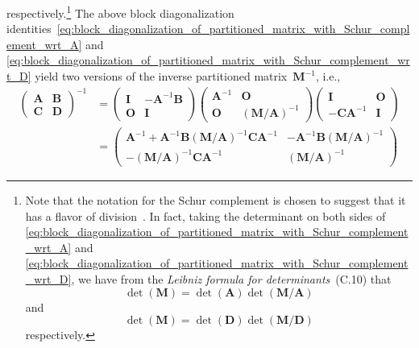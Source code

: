 \documentclass[12pt,a4paper]{article}
\begin{document}
respectively.\footnote{%
Note that the notation for the Schur complement is chosen to suggest that
it has a flavor of division~\citep{Minka:OldNewMatrixAlgebra}.
In fact, taking the determinant on both sides of
\eqref{eq:block_diagonalization_of_partitioned_matrix_with_Schur_complement_wrt_A} and
\eqref{eq:block_diagonalization_of_partitioned_matrix_with_Schur_complement_wrt_D},
we have from the \emph{Leibniz formula for determinants}~(C.10) that
\begin{equation}
\operatorname{det}(\mathbf{M}) =
\operatorname{det}(\mathbf{A}) \operatorname{det}(\mathbf{M}/\mathbf{A})
\end{equation}
and
\begin{equation}
\operatorname{det}(\mathbf{M}) =
\operatorname{det}(\mathbf{D}) \operatorname{det}(\mathbf{M}/\mathbf{D})
\end{equation}
respectively.}
The above block diagonalization
identities~\eqref{eq:block_diagonalization_of_partitioned_matrix_with_Schur_complement_wrt_A}
and \eqref{eq:block_diagonalization_of_partitioned_matrix_with_Schur_complement_wrt_D} yield
two versions of the inverse partitioned matrix~$\mathbf{M}^{-1}$, i.e.,
\begin{align}
\begin{pmatrix}
\mathbf{A} & \mathbf{B} \\
\mathbf{C} & \mathbf{D}
\end{pmatrix}^{-1}
&=
\begin{pmatrix}
\mathbf{I} & -\mathbf{A}^{-1}\mathbf{B} \\
\mathbf{O} & \mathbf{I}
\end{pmatrix}
\begin{pmatrix}
\mathbf{A}^{-1} & \mathbf{O} \\
\mathbf{O} & \left(\mathbf{M}/\mathbf{A}\right)^{-1}
\end{pmatrix}
\begin{pmatrix}
\mathbf{I} & \mathbf{O} \\
-\mathbf{C}\mathbf{A}^{-1} & \mathbf{I}
\end{pmatrix} \\
&=
\begin{pmatrix}
\mathbf{A}^{-1} +
\mathbf{A}^{-1}\mathbf{B} \left(\mathbf{M}/\mathbf{A}\right)^{-1} \mathbf{C}\mathbf{A}^{-1} &
-\mathbf{A}^{-1}\mathbf{B} \left(\mathbf{M}/\mathbf{A}\right)^{-1} \\
-\left(\mathbf{M}/\mathbf{A}\right)^{-1} \mathbf{C}\mathbf{A}^{-1} &
\left(\mathbf{M}/\mathbf{A}\right)^{-1}
\end{pmatrix}
\end{align}
\end{document}
